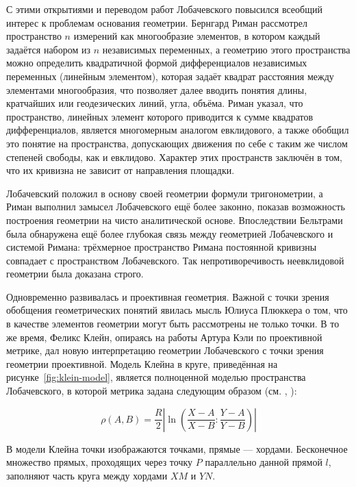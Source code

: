 \documentclass{article}
\numberwithin{equation}{section}
\providecommand{\abs}[1]{\left \lvert{#1}\right \rvert}
\begin{document}
С этими открытиями и переводом работ Лобачевского повысился всеобщий
интерес к проблемам основания геометрии. Бернгард Риман рассмотрел
пространство $n$ измерений как многообразие элементов, в котором
каждый задаётся набором из $n$ независимых переменных, а геометрию
этого пространства можно определить квадратичной формой дифференциалов
независимых переменных (линейным элементом), которая задаёт квадрат
расстояния между элементами многообразия, что позволяет далее вводить
понятия длины, кратчайших или геодезических линий, угла, объёма. Риман
указал, что пространство, линейных элемент которого приводится к сумме
квадратов дифференциалов, является многомерным аналогом евклидового, а
также обобщил это понятие на пространства, допускающих движения по
себе с таким же числом степеней свободы, как и евклидово. Характер
этих пространств заключён в том, что их кривизна не зависит от
направления площадки.

Лобачевский положил в основу своей геометрии формули тригонометрии, а
Риман выполнил замысел Лобачевского ещё более законно, показав
возможность построения геометрии на чисто аналитической основе.
Впоследствии Бельтрами была обнаружена ещё более глубокая связь между
геометрией Лобачевского и системой Римана: трёхмерное пространство
Римана постоянной кривизны совпадает с пространством Лобачевского. Так
непротиворечивость неевклидовой геометрии была доказана строго.

Одновременно развивалась и проективная геометрия. Важной с точки
зрения обобщения геометрических понятий явилась мысль Юлиуса Плюккера
о том, что в качестве элементов геометрии могут быть рассмотрены не
только точки. В то же время, Феликс Клейн, опираясь на работы Артура
Кэли по проективной метрике, дал новую интерпретацию геометрии
Лобачевского с точки зрения геометрии проективной. Модель Клейна в
круге, приведённая на рисунке \ref{fig:klein-model}, является
полноценной моделью пространства Лобачевского, в которой метрика
задана следующим образом (см. \cite{prasolov04}, \cite{zaslavsky04}):

\begin{equation}\label{eq:projective-metric}
  \rho(A, B) = \frac{R}{2} \abs{\ln{\left (
        \frac{X-A}{X-B}:\frac{Y-A}{Y-B} \right )}}
\end{equation}

В модели Клейна точки изображаются точками, прямые — хордами.
Бесконечное множество прямых, проходящих через точку $P$ параллельно
данной прямой $l$, заполняют часть круга между хордами $XM$ и $YN$.
\end{document}
